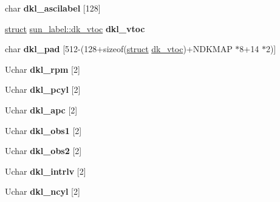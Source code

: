 \begin{DoxyCompactItemize}
\item 
\mbox{\label{structsun__label_a61286dfa2ec038c6e0b03f15d538e199}} 
char {\bfseries dkl\+\_\+ascilabel} \mbox{[}128\mbox{]}
\item 
\mbox{\label{structsun__label_a2679f9242b6fc83366180707f1b1b036}} 
\hyperlink{interfacestruct}{struct} \hyperlink{structsun__label_1_1dk__vtoc}{sun\+\_\+label\+::dk\+\_\+vtoc} {\bfseries dkl\+\_\+vtoc}
\item 
\mbox{\label{structsun__label_ae02823325790ed3c36475ceee760415b}} 
char {\bfseries dkl\+\_\+pad} \mbox{[}512-\/(128+sizeof(\hyperlink{interfacestruct}{struct} \hyperlink{structsun__label_1_1dk__vtoc}{dk\+\_\+vtoc})+N\+D\+K\+M\+AP $\ast$8+14 $\ast$2)\mbox{]}
\item 
\mbox{\label{structsun__label_a264e74b1f5b5cc03ba5bd026dd0d2f1f}} 
Uchar {\bfseries dkl\+\_\+rpm} \mbox{[}2\mbox{]}
\item 
\mbox{\label{structsun__label_a5e723dee2e3ca2480b93e222f903ec65}} 
Uchar {\bfseries dkl\+\_\+pcyl} \mbox{[}2\mbox{]}
\item 
\mbox{\label{structsun__label_a5c32d4df644a313fbb5a841db6071b24}} 
Uchar {\bfseries dkl\+\_\+apc} \mbox{[}2\mbox{]}
\item 
\mbox{\label{structsun__label_abc9169f8bc65700df3d9364b3e21c0e3}} 
Uchar {\bfseries dkl\+\_\+obs1} \mbox{[}2\mbox{]}
\item 
\mbox{\label{structsun__label_ace4e9e86dacef5ea39d558812f1bad55}} 
Uchar {\bfseries dkl\+\_\+obs2} \mbox{[}2\mbox{]}
\item 
\mbox{\label{structsun__label_a9129b12e83f39edb5991a79b0d6a4766}} 
Uchar {\bfseries dkl\+\_\+intrlv} \mbox{[}2\mbox{]}
\item 
\mbox{\label{structsun__label_a9eb7c7234b4e803906e10e1b161a99b4}} 
Uchar {\bfseries dkl\+\_\+ncyl} \mbox{[}2\mbox{]}
\item 

\end{DoxyCompactItemize}
